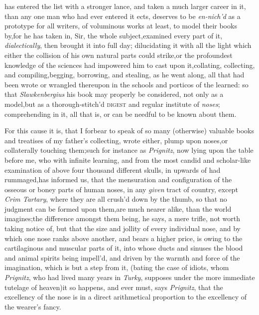 \documentclass{article}
\begin{document}
\noindent
{}
has entered the
list with a stronger lance, and taken a much larger career in it,
than any one man who had ever entered it  ects, deserves to be
\textit{en-nich’d} as a prototype for all writers, of
voluminous works at least, to model their books by,\tsh for
he has taken in, Sir, the whole subject,\tsk examined every part
of it, \textit{dialectically},\tsk\break
then brought it into full
day; dilucidating it with all the light which either the collision
of his own natural parts could strike,\tsk or the profoundest
knowledge of the sciences had impowered him to cast upon
it,\tsk collating, collecting, and compiling,\tsk begging,
borrowing, and stealing, as he went along, all that had
been wrote or wrangled thereupon in the schools and porticos
of the learned: so that \textit{Slawkenbergius} his book may
properly be considered, not only as a model,\tsk but as a
thorough-stitch’d \textsc{digest} and regular institute of
\textit{noses}; comprehending in it, all that is, or can be
needful to be known about them.

For this cause it is, that I forbear to speak of so many
(otherwise) valuable books and treatises of my father’s
collecting, wrote either, plump upon noses,\tsh or
collaterally touching them;\tsh such for instance as
\textit{Prignitz}, now lying upon the table before me, who with
infinite learning, and from the most candid and scholar-like
examination of above four thousand different skulls, in upwards of
 had
rummaged,\tsk has informed us, that the mensuration and
configuration of the osseous or boney parts of human noses, in any
\textit{given} tract of country, except \textit{Crim Tartary}, where
they are all crush’d down by the thumb, so that no judgment
can be formed upon them,\tsk are much nearer alike, than the world
imagines;\tsk the difference amongst them being, he says, a mere
trifle, not worth taking notice of,\break
\tsh but that the size and jollity of every individual nose, and by
which one nose ranks above another, and bears a higher price, is
owing to the cartilaginous and muscular parts of it, into whose
ducts and sinuses the blood and animal spirits being impell’d,
and driven by the warmth and force of the imagination, which is but
a step from it, (bating the case of idiots, whom \textit{Prignitz},
who had lived many years in \textit{Turky}, supposes under the more
immediate tutelage of heaven)\tsk it so happens, and ever must,
says \textit{Prignitz}, that the excellency of the nose is in a
direct arithmetical proportion to the excellency of the
wearer’s fancy.
\end{document}
